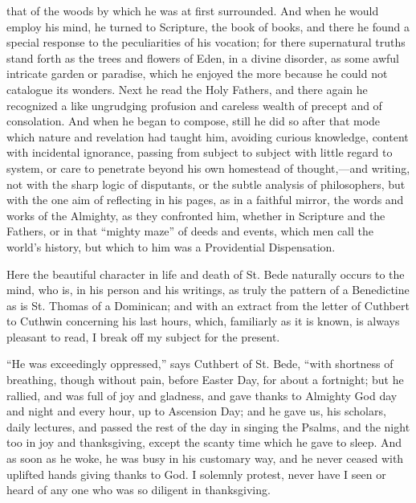 that of the woods by which he was at first surrounded. And when he
would employ his mind, he turned to Scripture, the book of books, and
there he found a special response to the peculiarities of his
vocation; for there supernatural truths stand forth as the trees and
flowers of Eden, in a divine disorder, as some awful intricate garden
or paradise, which he enjoyed the more because he could not catalogue
its wonders. Next he read the Holy Fathers, and there again he
recognized a like ungrudging profusion and careless wealth of precept
and of consolation. And when he began to compose, still he did so
after that mode which nature and revelation had taught him, avoiding curious knowledge, content with incidental ignorance, passing
from subject to subject with little regard to system, or care to
penetrate beyond his own homestead of thought,—and writing, not with
the sharp logic of disputants, or the subtle analysis of philosophers,
but with the one aim of reflecting in his pages, as in a faithful
mirror, the words and works of the Almighty, as they confronted him,
whether in Scripture and the Fathers, or in that ``mighty
maze'' of deeds and events, which men call the world's history,
but which to him was a Providential Dispensation.

Here the beautiful character in life and death of St. Bede
naturally occurs to the mind, who is, in his person and his writings,
as truly the pattern of a Benedictine as is St. Thomas of a Dominican;
and with an extract from the letter of Cuthbert to Cuthwin concerning
his last hours, which, familiarly as it is known, is always pleasant
to read, I break off my subject for the present.

``He was exceedingly oppressed,'' says Cuthbert of St. Bede,
``with shortness of breathing, though without pain, before Easter
Day, for about a fortnight; but he rallied, and was full of joy and
gladness, and gave thanks to Almighty God day and night and every
hour, up to Ascension Day; and he gave us, his scholars, daily
lectures, and passed the rest of the day in singing the Psalms, and
the night too in joy and thanksgiving, except the scanty time which he
gave to sleep. And as soon as he woke, he was busy in his customary
way, and he never ceased with uplifted hands giving thanks to God. I
solemnly protest, never have I seen or heard of any one who was so
diligent in thanksgiving.

